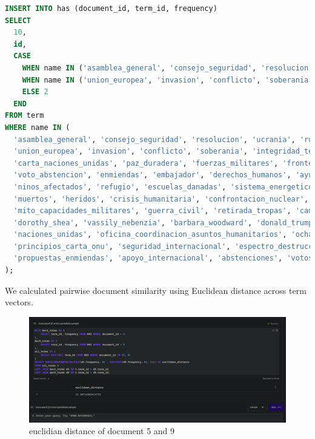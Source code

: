\documentclass[twoside]{article}
\begin{document}
\begin{lstlisting}[language=SQL,caption={Inserting Frequencies},label={lst:insertfrequencies}]
INSERT INTO has (document_id, term_id, frequency)
SELECT 
  10, 
  id, 
  CASE 
    WHEN name IN ('asamblea_general', 'consejo_seguridad', 'resolucion', 'ucrania', 'rusia', 'estados_unidos') THEN 4
    WHEN name IN ('union_europea', 'invasion', 'conflicto', 'soberania', 'integridad_territorial', 'hostilidades') THEN 3
    ELSE 2 
  END
FROM term 
WHERE name IN (
  'asamblea_general', 'consejo_seguridad', 'resolucion', 'ucrania', 'rusia', 'estados_unidos',
  'union_europea', 'invasion', 'conflicto', 'soberania', 'integridad_territorial', 'hostilidades',
  'carta_naciones_unidas', 'paz_duradera', 'fuerzas_militares', 'fronteras_internacionalmente_reconocidas',
  'voto_abstencion', 'enmiendas', 'embajador', 'derechos_humanos', 'ayuda_humanitaria', 'victimas_civiles',
  'ninos_afectados', 'refugio', 'escuelas_danadas', 'sistema_energetico', 'calefaccion', 'electricidad',
  'muertos', 'heridos', 'crisis_humanitaria', 'confrontacion_nuclear', 'orden_internacional', 'solidaridad',
  'mito_capacidades_militares', 'guerra_civil', 'retirada_tropas', 'camino_paz', 'vetos', 'mariana_betsa',
  'dorothy_shea', 'vassily_nebenzia', 'barbara_woodward', 'donald_trump', 'kiev', 'moscu', 'onu',
  'naciones_unidas', 'oficina_coordinacion_asuntos_humanitarios', 'ocha', 'resolucion_pacifica_disputas',
  'principios_carta_onu', 'seguridad_internacional', 'espectro_destruccion_total', 'causa_profunda_conflicto',
  'propuestas_enmiendas', 'apoyo_internacional', 'abstenciones', 'votos_favor', 'votos_contra'
);
\end{lstlisting}

We calculated pairwise document similarity using Euclidean distance across term vectors.

\begin{figure}[H]
  \centering
  \includegraphics[width=1\textwidth]{imgs/euclidian.png}
  \caption{euclidian distance of document 5 and 9}
  \label{fig:4}
\end{figure}
\end{document}
